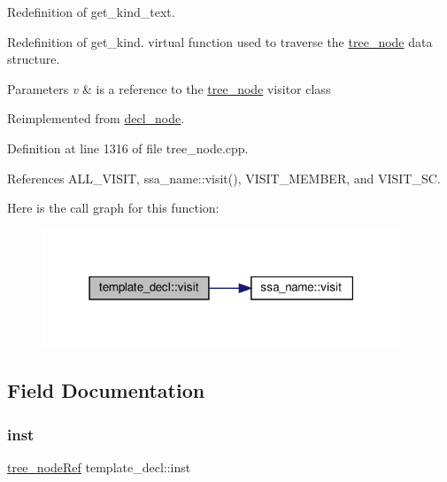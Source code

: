 Redefinition of get\+\_\+kind\+\_\+text. 

Redefinition of get\+\_\+kind. virtual function used to traverse the \hyperlink{classtree__node}{tree\+\_\+node} data structure. 
\begin{DoxyParams}{Parameters}
{\em v} & is a reference to the \hyperlink{classtree__node}{tree\+\_\+node} visitor class \\
\hline
\end{DoxyParams}


Reimplemented from \hyperlink{structdecl__node_a9e63331f0c35d9af9d1997afafe9152a}{decl\+\_\+node}.



Definition at line 1316 of file tree\+\_\+node.\+cpp.



References A\+L\+L\+\_\+\+V\+I\+S\+IT, ssa\+\_\+name\+::visit(), V\+I\+S\+I\+T\+\_\+\+M\+E\+M\+B\+ER, and V\+I\+S\+I\+T\+\_\+\+SC.

Here is the call graph for this function\+:
\nopagebreak
\begin{figure}[H]
\begin{center}
\leavevmode
\includegraphics[width=303pt]{d1/df5/structtemplate__decl_a38f7c267485cd3aaefda2f7f49132af1_cgraph}
\end{center}
\end{figure}


\subsection{Field Documentation}
\mbox{\label{structtemplate__decl_ac96f3534bdae1b9d21603be55210024e}} 
\subsubsection{\texorpdfstring{inst}{inst}}
{\footnotesize\ttfamily \hyperlink{tree__node_8hpp_a6ee377554d1c4871ad66a337eaa67fd5}{tree\+\_\+node\+Ref} template\+\_\+decl\+::inst}



